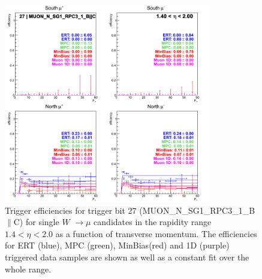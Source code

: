 \begin{figure}[h!]

  \centering

  \includegraphics[width=0.8\textwidth]{./figures/run13_trigeffipt_eta1_trig27_lin.png}
  \caption{\label{fig:run13_trigeffipt_eta1_nper0_trig27_lin} Trigger efficiencies for trigger bit 27 (MUON\_N\_SG1\_RPC3\_1\_B$\|$C) for single $W$ $\rightarrow \mu$ candidates in the rapidity range $ 1.4 < \eta < 2.0$ as a function of transverse momentum. The efficiencies for ERT (blue), MPC (green), MinBias(red) and 1D (purple) triggered data samples are shown as well as a constant fit over the whole range.}

\end{figure}
\clearpage

